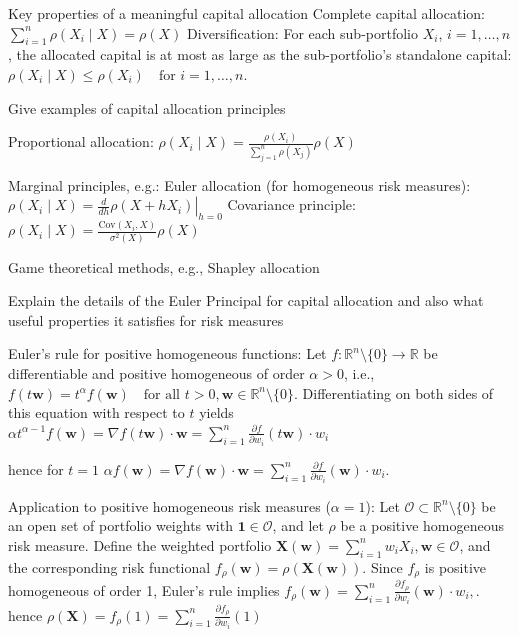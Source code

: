 {Key properties of a meaningful capital allocation
Complete capital allocation: \(\sum_{i=1}^n \rho(X_i \mid X) = \rho(X)\)
Diversification: For each sub-portfolio \(X_i\), \(i = 1, \ldots, n\), the allocated capital is at most as large as the sub-portfolio’s standalone capital:
\(
\rho(X_i \mid X) \leq \rho(X_i) \quad \text{for } i = 1, \ldots, n.
\)

Give examples of capital allocation principles

Proportional allocation:
\(
\rho(X_i \mid X) = \frac{\rho(X_i)}{\sum_{j=1}^n \rho(X_j)} \rho(X)
\)

Marginal principles, e.g.:
Euler allocation (for homogeneous risk measures):
\(
\rho(X_i \mid X) = \left. \frac{d}{dh} \rho(X + h X_i) \right|_{h=0}
\)
 Covariance principle:
\(
\rho(X_i \mid X) = \frac{\text{Cov}(X_i, X)}{\sigma^2(X)} \rho(X)
\)

Game theoretical methods, e.g., Shapley allocation


Explain the details of the Euler Principal for capital allocation
and also what useful properties it satisfies for risk measures


Euler's rule for positive homogeneous functions:
Let \( f : \mathbb{R}^n \setminus \{0\} \to \mathbb{R} \) be differentiable and positive homogeneous of order \(\alpha > 0\), i.e.,
\(
f(t\mathbf{w}) = t^\alpha f(\mathbf{w}) \quad \text{for all } t > 0, \mathbf{w} \in \mathbb{R}^n \setminus \{0\}.
\)
Differentiating on both sides of this equation with respect to \(t\) yields
\(
\alpha t^{\alpha-1} f(\mathbf{w}) = \nabla f(t\mathbf{w}) \cdot \mathbf{w} = \sum_{i=1}^n \frac{\partial f}{\partial w_i} (t\mathbf{w}) \cdot w_i
\)

hence for \( t = 1 \)
\(\alpha f(\mathbf{w}) = \nabla f(\mathbf{w}) \cdot \mathbf{w} = \sum_{i=1}^n \frac{\partial f}{\partial w_i} (\mathbf{w}) \cdot w_i\).

Application to positive homogeneous risk measures (\(\alpha = 1\)):
Let \(\mathcal{O} \subset \mathbb{R}^n \setminus \{0\}\) be an open set of portfolio weights with \(\mathbf{1} \in \mathcal{O}\), 
and let \(\rho\) be a positive homogeneous risk measure.
Define the weighted portfolio \(\mathbf{X}(\mathbf{w}) = \sum_{i=1}^n w_i X_i, \mathbf{w} \in \mathcal{O}\), and the corresponding risk functional
\(
f_\rho(\mathbf{w}) = \rho(\mathbf{X}(\mathbf{w})).
\)
Since \(f_\rho\) is positive homogeneous of order 1, Euler's rule implies
\(
f_\rho(\mathbf{w}) = \sum_{i=1}^n \frac{\partial f_\rho}{\partial w_i} (\mathbf{w}) \cdot w_i, .
\)
hence
 \(\rho(\mathbf{X}) = f_\rho(1) = \sum_{i=1}^n \frac{\partial f_\rho}{\partial w_i} (1)\)

}
